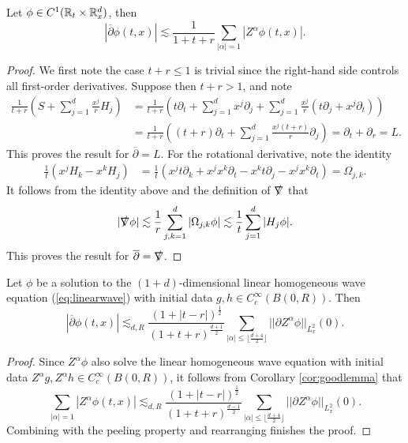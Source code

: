 \begin{theorem}
	Let $\phi \in C^1 (\mathbb R_t \times \mathbb R^d_x)$, then 
		\[ |\overline \partial \phi (t, x) | \lesssim \frac{1}{1 + t + r} \sum_{|\alpha| = 1} |Z^\alpha \phi (t, x)|.\] \label{thm:peel}
\end{theorem}

\begin{proof}
	We first note the case $t + r \leq 1$ is trivial since the right-hand side controls all first-order derivatives. Suppose then $t + r > 1$, and note
		\begin{align*}
			\frac{1}{t + r} \left( S + \sum_{j = 1}^d \frac{x^j}{r} H_j \right) 
				&= \frac{1}{t + r} \left( t \partial_t + \sum_{j = 1}^d x^j \partial_j + \sum_{j = 1}^d \frac{x^j}{r} \left( t \partial_j + x^j \partial_t \right) \right)\\
				&= \frac{1}{t + r} \left( (t + r)\partial_t + \sum_{j = 1}^d \frac{x^j (t + r)}{r} \partial_j\right)  = \partial_t + \partial_r = L.
		\end{align*}
	This proves the result for $\overline\partial = L$. For the rotational derivative, note the identity
		\begin{align*}
			\frac1t \left( x^j H_k - x^k H_j\right)
				&= \frac1t \left( x^j t \partial_k + x^j x^k \partial_t -  x^k t \partial_j -x^j x^k \partial_t  \right) = \Omega_{j, k}.
		\end{align*}	
	It follows from the identity above and the definition of $\slashed \nabla$ that 
		\[ |\slashed \nabla \phi| \lesssim \frac1r \sum_{j, k = 1}^d |\Omega_{j, k} \phi| \lesssim \frac1t \sum_{j = 1}^d |H_j \phi|. \]
	This proves the result for $\overline\partial =\slashed \nabla$.	
\end{proof}

\begin{corollary}
	Let $\phi$ be a solution to the $(1 + d)$-dimensional linear homogeneous wave equation (\ref{eq:linearwave}) with initial data $g, h \in C^\infty_c (B(0, R))$. Then 
		\[ |\overline \partial \phi (t, x)| \lesssim_{d, R} \frac{(1 + |t - r|)^\frac12}{(1 + t + r)^{\frac{d + 1}{2}}} \sum_{|\alpha| \leq \lfloor \frac{d + 4}{2} \rfloor} ||\partial Z^\alpha \phi ||_{L^2_x} (0). \]
\end{corollary}

\begin{proof}
	Since $Z^\alpha \phi$ also solve the linear homogeneous wave equation with initial data $Z^\alpha g, Z^\alpha h \in C^\infty_c (B(0, R))$, it follows from Corollary \ref{cor:goodlemma} that
		\[   \sum_{|\alpha| = 1} |Z^\alpha \phi (t, x)| \lesssim_{d, R}  \frac{(1 + |t - r|)^{\frac12}}{(1 + t + r)^{\frac{d - 1}{2}} } \sum_{|\alpha| \leq \lfloor \frac{d + 4}{2} \rfloor} ||\partial Z^\alpha \phi ||_{L^2_x} (0). \]
	Combining with the peeling property and rearranging finishes the proof.
\end{proof}

